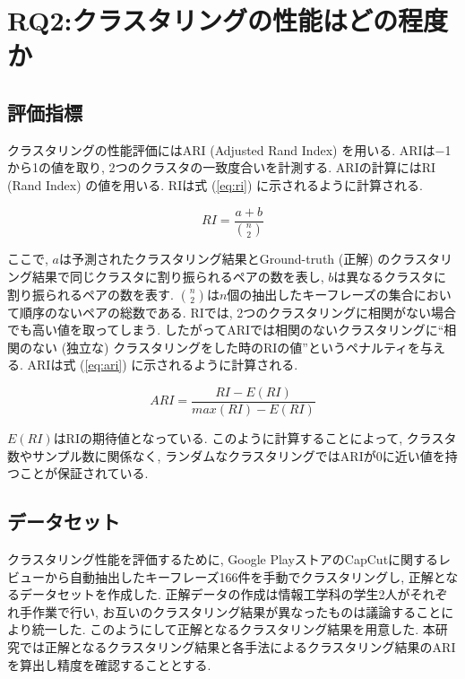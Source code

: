 
\section{RQ2:クラスタリングの性能はどの程度か}
\subsection{評価指標}
クラスタリングの性能評価にはARI (Adjusted Rand Index) を用いる. ARIは$-$1から1の値を取り, 2つのクラスタの一致度合いを計測する. 
ARIの計算にはRI (Rand Index) の値を用いる. RIは式 (\ref{eq:ri}) に示されるように計算される. 

\begin{equation}
  \label{eq:ri}
  RI = \frac{a+b}{\binom{n}{2}}
\end{equation}

ここで, \(a\)は予測されたクラスタリング結果とGround-truth (正解) のクラスタリング結果で同じクラスタに割り振られるペアの数を表し, \(b\)は異なるクラスタに割り振られるペアの数を表す. \(\binom{n}{2}\)は\(n\)個の抽出したキーフレーズの集合において順序のないペアの総数である. 
RIでは, 2つのクラスタリングに相関がない場合でも高い値を取ってしまう. したがってARIでは相関のないクラスタリングに``相関のない (独立な) クラスタリングをした時のRIの値''というペナルティを与える. ARIは式 (\ref{eq:ari}) に示されるように計算される. 

\begin{equation}
  \label{eq:ari}
  ARI = \frac{RI-E (RI) }{max (RI) -E (RI) }
\end{equation}

\(E(RI)\)はRIの期待値となっている. このように計算することによって, クラスタ数やサンプル数に関係なく, ランダムなクラスタリングではARIが0に近い値を持つことが保証されている. 

\subsection{データセット}
クラスタリング性能を評価するために, Google PlayストアのCapCutに関するレビューから自動抽出したキーフレーズ166件を手動でクラスタリングし, 正解となるデータセットを作成した. 正解データの作成は情報工学科の学生2人がそれぞれ手作業で行い, お互いのクラスタリング結果が異なったものは議論することにより統一した. 
このようにして正解となるクラスタリング結果を用意した. 本研究では正解となるクラスタリング結果と各手法によるクラスタリング結果のARIを算出し精度を確認することとする. 

